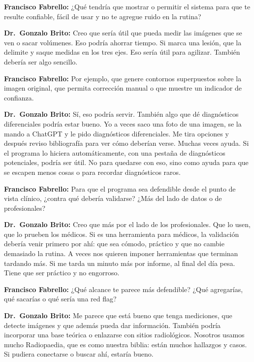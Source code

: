 \noindent\textbf{Francisco Fabrello:} ¿Qué tendría que mostrar o permitir el sistema para que te resulte confiable, fácil de usar y no te agregue ruido en la rutina?

\noindent\textbf{Dr.~Gonzalo Brito:} Creo que sería útil que pueda medir las imágenes que se ven o sacar volúmenes. Eso podría ahorrar tiempo. Si marca una lesión, que la delimite y saque medidas en los tres ejes. Eso sería útil para agilizar. También debería ser algo sencillo.

\noindent\textbf{Francisco Fabrello:} Por ejemplo, que genere contornos superpuestos sobre la imagen original, que permita corrección manual o que muestre un indicador de confianza.

\noindent\textbf{Dr.~Gonzalo Brito:} Sí, eso podría servir. También algo que dé diagnósticos diferenciales podría estar bueno. Yo a veces saco una foto de una imagen, se la mando a ChatGPT y le pido diagnósticos diferenciales. Me tira opciones y después reviso bibliografía para ver cómo deberían verse. Muchas veces ayuda. Si el programa lo hiciera automáticamente, con una pestaña de diagnósticos potenciales, podría ser útil. No para quedarse con eso, sino como ayuda para que se escapen menos cosas o para recordar diagnósticos raros.

\noindent\textbf{Francisco Fabrello:} Para que el programa sea defendible desde el punto de vista clínico, ¿contra qué debería validarse? ¿Más del lado de datos o de profesionales?

\noindent\textbf{Dr.~Gonzalo Brito:} Creo que más por el lado de los profesionales. Que lo usen, que lo prueben los médicos. Si es una herramienta para médicos, la validación debería venir primero por ahí: que sea cómodo, práctico y que no cambie demasiado la rutina. A veces nos quieren imponer herramientas que terminan tardando más. Si me tarda un minuto más por informe, al final del día pesa. Tiene que ser práctico y no engorroso.

\noindent\textbf{Francisco Fabrello:} ¿Qué alcance te parece más defendible? ¿Qué agregarías, qué sacarías o qué sería una red flag?

\noindent\textbf{Dr.~Gonzalo Brito:} Me parece que está bueno que tenga mediciones, que detecte imágenes y que además pueda dar información. También podría incorporar una base teórica o enlazarse con sitios radiológicos. Nosotros usamos mucho Radiopaedia, que es como nuestra biblia: están muchos hallazgos y casos. Si pudiera conectarse o buscar ahí, estaría bueno.

